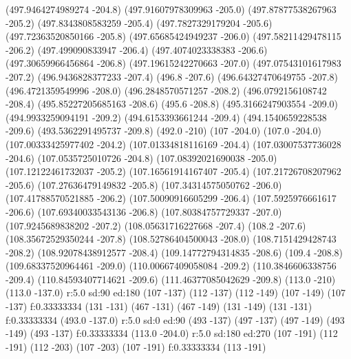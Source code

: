 {\lvec (497.9464274989274 -204.8)
\lvec (497.91607978309963 -205.0)
\lvec (497.87877538267963 -205.2)
\lvec (497.8343808583259 -205.4)
\lvec (497.7827329179204 -205.6)
\lvec (497.72363520850166 -205.8)
\lvec (497.65685424949237 -206.0)
\lvec (497.58211429478115 -206.2)
\lvec (497.499090833947 -206.4)
\lvec (497.4074023338383 -206.6)
\lvec (497.30659966456864 -206.8)
\lvec (497.19615242270663 -207.0)
\lvec (497.07543101617983 -207.2)
\lvec (496.9436828377233 -207.4)
\lvec (496.8 -207.6)
\lvec (496.64327470649755 -207.8)
\lvec (496.4721359549996 -208.0)
\lvec (496.2848570571257 -208.2)
\lvec (496.0792156108742 -208.4)
\lvec (495.85227205685163 -208.6)
\lvec (495.6 -208.8)
\lvec (495.3166247903554 -209.0)
\lvec (494.9933259094191 -209.2)
\lvec (494.6153393661244 -209.4)
\lvec (494.1540659228538 -209.6)
\lvec (493.5362291495737 -209.8)
\lvec (492.0 -210)
\move (107 -204.0)
\lvec (107.0 -204.0)
\lvec (107.00333425977402 -204.2)
\lvec (107.01334818116169 -204.4)
\lvec (107.03007537736028 -204.6)
\lvec (107.0535725010726 -204.8)
\lvec (107.08392021690038 -205.0)
\lvec (107.12122461732037 -205.2)
\lvec (107.16561914167407 -205.4)
\lvec (107.21726708207962 -205.6)
\lvec (107.27636479149832 -205.8)
\lvec (107.34314575050762 -206.0)
\lvec (107.41788570521885 -206.2)
\lvec (107.50090916605299 -206.4)
\lvec (107.5925976661617 -206.6)
\lvec (107.69340033543136 -206.8)
\lvec (107.80384757729337 -207.0)
\lvec (107.9245689838202 -207.2)
\lvec (108.05631716227668 -207.4)
\lvec (108.2 -207.6)
\lvec (108.35672529350244 -207.8)
\lvec (108.52786404500043 -208.0)
\lvec (108.7151429428743 -208.2)
\lvec (108.92078438912577 -208.4)
\lvec (109.14772794314835 -208.6)
\lvec (109.4 -208.8)
\lvec (109.68337520964461 -209.0)
\lvec (110.00667409058084 -209.2)
\lvec (110.3846606338756 -209.4)
\lvec (110.84593407714621 -209.6)
\lvec (111.46377085042629 -209.8)
\lvec (113.0 -210)
\move(113.0 -137.0)
\larc r:5.0 sd:90 ed:180
\move (107 -137)
\lvec (112 -137)
\lvec (112 -149)
\lvec (107 -149)
\lvec (107 -137)
\lfill f:0.33333334
\move (131 -131)
\lvec (467 -131)
\lvec (467 -149)
\lvec (131 -149)
\lvec (131 -131)
\lfill f:0.33333334
\move(493.0 -137.0)
\larc r:5.0 sd:0 ed:90
\move (493 -137)
\lvec (497 -137)
\lvec (497 -149)
\lvec (493 -149)
\lvec (493 -137)
\lfill f:0.33333334
\move(113.0 -204.0)
\larc r:5.0 sd:180 ed:270
\move (107 -191)
\lvec (112 -191)
\lvec (112 -203)
\lvec (107 -203)
\lvec (107 -191)
\lfill f:0.33333334
\move (113 -191)
}
